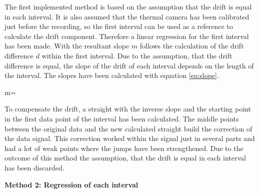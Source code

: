 The first implemented method is based on the assumption that the drift is equal in each interval. It is also assumed that the thermal camera has been calibrated just before the recording, so the first interval can be used as a reference to calculate the drift component. Therefore a linear regression for the first interval has been made. With the resultant slope $m$ follows the calculation of the drift difference $d$ within the first interval. Due to the assumption, that the drift difference is equal, the slope of the drift of each interval depends on the length of the interval. The slopes have been calculated with equation \ref{eq:slope}.
\begin{flaglign}
	m=
	\label{eq:slope}
\end{flaglign}
To compensate the drift, a straight with the inverse slope and the starting point in the first data point of the interval has been calculated. The middle points between the original data and the new calculated straight build the correction of the data signal.
This correction worked within the signal just in several parts and had a lot of weak points where the jumps have been strengthened. Due to the outcome of this method the assumption, that the drift is equal in each interval has been discarded. 

\textbf{Method 2: Regression of each interval}

